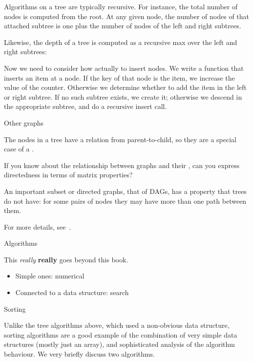 Algorithms on a tree are typically recursive. For instance, the total
number of nodes is computed from the root. At any given node, the
number of nodes of that attached subtree is one plus the number of
nodes of the left and right subtrees.
%

Likewise, the depth of a tree is computed as a recursive max over the
left and right subtrees:
%

Now we need to consider how actually to insert nodes. We write a
function that inserts an item at a node. If the key of that node is
the item, we increase the value of the counter. Otherwise we determine
whether to add the item in the left or right subtree. If no such
subtree exists, we create it; otherwise we descend in the appropriate
subtree, and do a recursive insert call.
%


 {Other graphs}

The nodes in a tree have a relation from parent-to-child, so
they are a special case of a .

\begin{exercise}
  If you know about the relationship between graphs and their
  ,
  can you express directedness in terms of matrix properties?
\end{exercise}

An important subset or directed graphs, that of \acp{DAG},
has a property that trees do not have:
for some pairs of nodes they may have more than one
path between them.

For more details, see~.

 {Algorithms}

This \emph{really} \textbf{really} goes beyond this book.

\begin{itemize}
\item Simple ones: numerical
\item Connected to a data structure: search
\end{itemize}

 {Sorting}

Unlike the tree algorithms above, which used a non-obvious data
structure,
sorting algorithms are a good example of the combination of very
simple data structures (mostly just an array), and sophisticated
analysis of the algorithm behaviour. We very briefly discuss two
algorithms.

